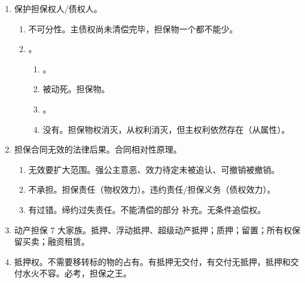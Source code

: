 \begin{enumerate}
\begin{enumerate}
\begin{enumerate}
                  \item 范围。\yi 责任 \xydy 主债务人。\er 有约从约，无约包括利息、违约金、损害赔偿金、费用等。
                  \item 消灭。主债权消灭，从权力随之消灭。
                \end{enumerate}
          \item {}。约定标的物所有权归债权人所有。
                \begin{enumerate}
                  \item 针对物保，不针对人保（保证合同）。。
                  \item {}。
                \end{enumerate}
        \end{enumerate}
  \item 保护担保权人/债权人。
        \begin{enumerate}
          \item 不可分性。主债权尚未清偿完毕，担保物一个都不能少。
          \item {}。
                \begin{enumerate}
                  \item {}。
                  \item 被动死。担保物。
                  \item {}。
                  \item 没有。担保物权消灭，从权利消灭，但主权利依然存在（从属性）。
                \end{enumerate}
        \end{enumerate}
  \item 担保合同无效的法律后果。合同相对性原理。
        \begin{enumerate}
          \item 无效要扩大范围。强公主意恶、效力待定未被追认、可撤销被撤销。
          \item 不承担。\yi 担保责任（物权效力）。\er 违约责任/担保义务（债权效力）。
          \item 有过错。\yi 缔约过失责任。\er 不能清偿的部分 \yjt 补充。\san 无条件追偿权。
        \end{enumerate}
  \item 动产担保 7 大家族。抵押、浮动抵押、超级动产抵押；质押；留置；所有权保留买卖；融资租赁。
  \item 抵押权。不需要移转标的物的占有。有抵押无交付，有交付无抵押，抵押和交付水火不容。必考，担保之王。

\end{enumerate}
